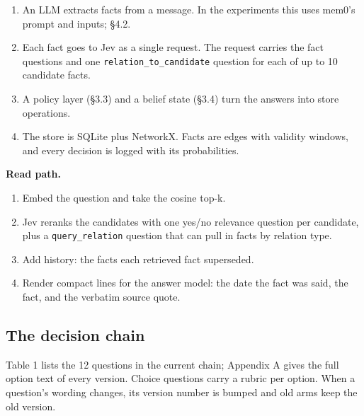 \documentclass[11pt]{article}
\newcommand{\src}[1]{}
\begin{document}
\begin{enumerate}
\item An LLM extracts facts from a message. In the experiments this uses mem0's prompt and inputs; \S{}4.2.
\item Each fact goes to Jev as a single request. The request carries the fact questions and one \texttt{relation\_\allowbreak{}to\_\allowbreak{}candidate} question for each of up to 10\src{src/engram/config.py} candidate facts.
\item A policy layer (\S{}3.3) and a belief state (\S{}3.4) turn the answers into store operations.
\item The store is SQLite plus NetworkX. Facts are edges with validity windows, and every decision is logged with its probabilities.
\end{enumerate}
\textbf{Read path.}

\begin{enumerate}
\item Embed the question and take the cosine top-k.
\item Jev reranks the candidates with one yes/no relevance question per candidate, plus a \texttt{query\_\allowbreak{}relation} question that can pull in facts by relation type.
\item Add history: the facts each retrieved fact superseded.
\item Render compact lines for the answer model: the date the fact was said, the fact, and the verbatim source quote.
\end{enumerate}
\subsection{The decision chain}
Table 1 lists the 12\src{src/engram/decide/questions.py (ALL_QUESTIONS)} questions in the current chain; Appendix A gives the full option text of every version. Choice questions carry a rubric per option. When a question's wording changes, its version number is bumped and old arms keep the old version.
\end{document}
